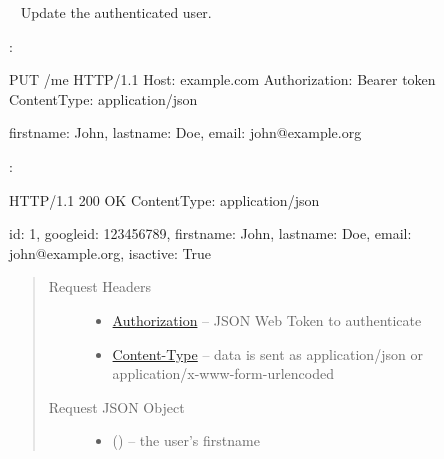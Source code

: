 \documentclass[letterpaper,10pt,english]{sphinxmanual}
\begin{document}
\begin{DUlineblock}{0em}
\item[] 
\end{DUlineblock}


\begin{fulllineitems}
\label{\detokenize{resources/user:put--me}}~
Update the authenticated user.

:

\begin{sphinxVerbatim}[commandchars=\\\{\}]
PUT /me HTTP/1.1
Host: example.com
Authorization: Bearer \PYGZlt{}token\PYGZgt{}
Content\PYGZhy{}Type: application/json

\PYGZob{}
    \PYGZsq{}firstname\PYGZsq{}: \PYGZsq{}John\PYGZsq{},
    \PYGZsq{}lastname\PYGZsq{}: \PYGZsq{}Doe\PYGZsq{},
    \PYGZsq{}email\PYGZsq{}: \PYGZsq{}john@example.org\PYGZsq{}
\PYGZcb{}
\end{sphinxVerbatim}

:

\begin{sphinxVerbatim}[commandchars=\\\{\}]
HTTP/1.1 200 OK
Content\PYGZhy{}Type: application/json

\PYGZob{}
    \PYGZsq{}id\PYGZsq{}: 1,
    \PYGZsq{}google\PYGZus{}id\PYGZsq{}: \PYGZsq{}123456789\PYGZsq{},
    \PYGZsq{}firstname\PYGZsq{}: \PYGZsq{}John\PYGZsq{},
    \PYGZsq{}lastname\PYGZsq{}: \PYGZsq{}Doe\PYGZsq{},
    \PYGZsq{}email\PYGZsq{}: \PYGZsq{}john@example.org\PYGZsq{},
    \PYGZsq{}is\PYGZus{}active\PYGZsq{}: True
\PYGZcb{}
\end{sphinxVerbatim}
\begin{quote}\begin{description}
\item[{Request Headers}] \leavevmode\begin{itemize}
\item {} 
\href{http://tools.ietf.org/html/rfc7235\#section-4.2}{Authorization} -- JSON Web Token to authenticate

\item {} 
\href{http://tools.ietf.org/html/rfc7231\#section-3.1.1.5}{Content-Type} -- data is sent as application/json or
application/x-www-form-urlencoded

\end{itemize}

\item[{Request JSON Object}] \leavevmode\begin{itemize}
\item {} 
 () -- the user's firstname


\end{itemize}
\end{description}
\end{quote}
\end{fulllineitems}
\end{document}
